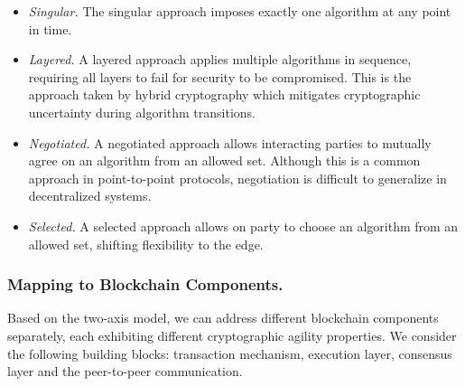 \begin{itemize}
    \item \emph{Singular.} The singular approach imposes exactly one algorithm at any point in time. 
    \item \emph{Layered.} A layered approach applies multiple algorithms in sequence, requiring all layers to fail for security to be compromised. 
    This is the approach taken by hybrid cryptography which mitigates cryptographic uncertainty during algorithm transitions.
    \item \emph{Negotiated.}
    A negotiated approach allows interacting parties to mutually agree on an algorithm from an allowed set. 
    Although this is a common approach in point-to-point protocols, negotiation is difficult to generalize in decentralized systems.
    \item \emph{Selected.}
    A selected approach allows on party to choose an algorithm from an allowed set, shifting flexibility to the edge.
\end{itemize}


\subsubsection{Mapping to Blockchain Components.} 
Based on the two-axis model, we can address different blockchain components separately, each exhibiting different cryptographic agility properties. 
We consider the following building blocks: transaction mechanism, execution layer, consensus layer and the peer-to-peer communication.

